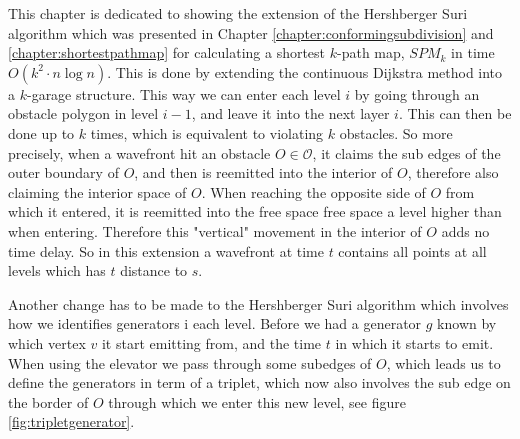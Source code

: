 \label{chapter:shortestpathobstaclesviolation}

This chapter is dedicated to showing the extension of the Hershberger Suri
algorithm which was presented in Chapter \ref{chapter:conformingsubdivision}
and \ref{chapter:shortestpathmap} for calculating a shortest $k$-path map,
$SPM_k$ in time $O(k^2 \cdot n \log n)$. This is done by extending the
continuous Dijkstra method into a $k$-garage structure. This way we can enter
each level $i$ by going through an obstacle polygon in level $i-1$, and leave
it into the next layer $i$. This can then be done up to $k$ times, which is
equivalent to violating $k$ obstacles. So more precisely, when a wavefront hit
an obstacle $O \in \mathcal{O}$, it claims the sub edges of the outer boundary
of $O$, and then is reemitted into the interior of $O$, therefore also
claiming the interior space of $O$. When reaching the opposite side of $O$ from
which it entered, it is reemitted into the free space free space a level
higher than when entering. Therefore this "vertical" movement in the interior
of $O$ adds no time delay. So in this extension a wavefront at time $t$
contains all points at all levels which has $t$ distance to $s$. 

Another change has to be made to the Hershberger Suri algorithm which involves
how we identifies generators i each level. Before we had a generator $g$ known
by which vertex $v$ it start emitting from, and the time $t$ in which it starts
to emit. When using the elevator we pass through some subedges of $O$, which
leads us to define the generators in term of a triplet, which now also involves
the sub edge on the border of $O$ through which we enter this new level, see
figure \ref{fig:tripletgenerator}.

